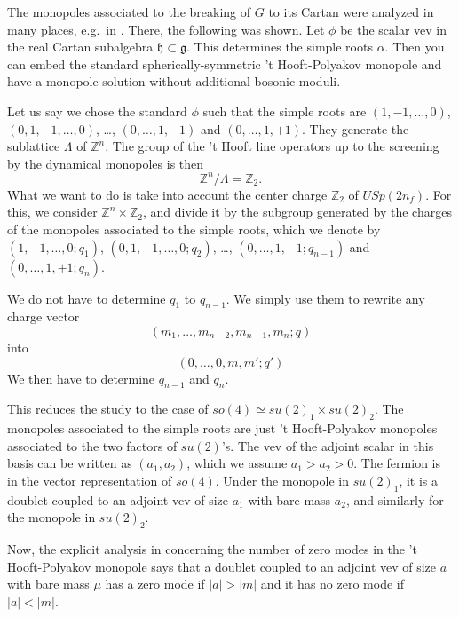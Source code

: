 \documentclass[12pt]{article}
\numberwithin{equation}{section}
\def\bZ{\mathbb{Z}}
\begin{document}
The monopoles associated to the breaking of $G$ to its Cartan were analyzed in many places, 
e.g.~in \cite{Weinberg:1979zt}.
There, the following was shown.
Let $\phi$ be the scalar vev in the real Cartan subalgebra $\mathfrak{h}\subset \mathfrak{g}$.
This determines the simple roots $\alpha$.
Then you can embed the standard spherically-symmetric 't Hooft-Polyakov monopole and have a monopole solution without additional bosonic moduli. 

Let us say we chose the standard $\phi$ such that the simple roots are $(1,-1,\ldots,0)$,
$(0,1,-1,\ldots,0)$, \ldots, $(0,\ldots,1,-1)$ and $(0,\ldots,1,+1)$.
They generate the sublattice $\Lambda$ of $\bZ^n$.
The group of the 't Hooft line operators up to the screening by the dynamical monopoles is then \begin{equation}
\bZ^n / \Lambda = \bZ_2.
\end{equation}
What we want to do is take into account the center charge $\bZ_2$ of $USp(2n_f)$. 
For this, we consider $\bZ^n\times \bZ_2$,
and divide it by the subgroup generated by the charges of the monopoles associated to the simple roots,
which we denote by $(1,-1,\ldots, 0; q_1)$, $(0,1,-1,\ldots, 0; q_2)$, \ldots,
$(0,\ldots, 1,-1; q_{n-1})$ and $(0,\ldots,1,+1; q_n)$.

We do not have to determine $q_1$ to $q_{n-1}$. We simply use them to rewrite any charge vector \begin{equation}
(m_1,\ldots, m_{n-2}, m_{n-1},m_n; q)
\end{equation} 
into \begin{equation}
(0,\ldots,0, m, m' ; q')
\end{equation}
We then have to determine $q_{n-1}$ and $q_n$.

This reduces the study to the case of $so(4)\simeq su(2)_1 \times su(2)_2$.
The monopoles associated to the simple roots are just 't Hooft-Polyakov monopoles associated to the two factors of $su(2)$'s.
The vev of the adjoint scalar in this basis can be written as $(a_1,a_2)$, which we assume $a_1>a_2>0$.
The fermion is in the vector representation of $so(4)$.
Under the monopole in $su(2)_1$, it is a doublet coupled to an adjoint vev of size $a_1$ with bare mass $a_2$,
and similarly for the monopole in $su(2)_2$.

Now, the explicit analysis in \cite[Sec.~IV]{Callias:1977kg} concerning the number of zero modes in the 't Hooft-Polyakov monopole says that 
a doublet coupled to an adjoint vev of size $a$ with bare mass $\mu$ has
 a zero mode if $|a|>|m|$ and 
 it has no zero mode if $|a|<|m|$.
 
\end{document}
